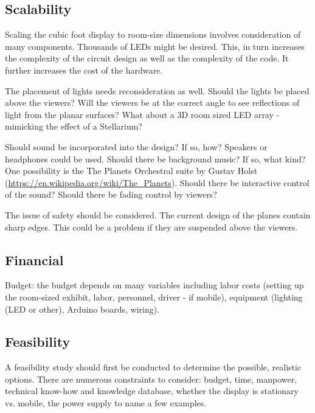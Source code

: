 \documentclass{article}
\begin{document}
\subsection{Scalability} 
Scaling the cubic foot display to room-size dimensions involves consideration of many components. Thousands of LEDs might be desired. This, in turn increases the complexity of the circuit design as well as the complexity of the code. It further increases the cost of the hardware. 

The placement of lights needs reconsideration as well. Should the lights be placed above the viewers? Will the viewers be at the correct angle to see reflections of light from the planar surfaces? What about a 3D room sized LED array - mimicking the effect of a Stellarium?

Should sound be incorporated into the design? If so, how? Speakers or headphones could be used. Should there be background music? If so, what kind? One possibility is the The Planets Orchestral suite by Gustav Holst (\url{https://en.wikipedia.org/wiki/The_Planets}). Should there be interactive control of the sound? Should there be fading control by viewers?

The issue of safety should be considered. The current design of the planes contain sharp edges. This could be a problem if they are suspended above the viewers. 

\subsection{Financial}
Budget: the budget depends on many variables including labor costs (setting up the room-sized exhibit, labor, personnel, driver - if mobile), equipment (lighting (LED or other), Arduino boards, wiring). 

\subsection{Feasibility}
A feasibility study should first be conducted to determine the possible, realistic options. There are numerous constraints to consider: budget, time, manpower, technical know-how and knowledge database, whether the display is stationary vs. mobile, the power supply to name a few examples. 
\end{document}
